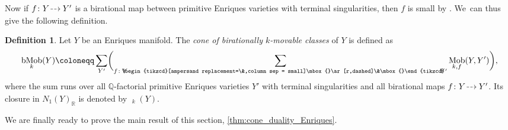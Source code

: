 \documentclass[JEP,XML,SOM,Unicode,published]{cedram}
\newcommand{\dradpl}{{\hspace*{-2.5mm}\begin{tikzcd}[ampersand replacement=\&,column sep = scriptsize]\mbox{}\ar[r,dashed]\&\mbox{}\end{tikzcd}\hspace*{-2.5mm}}}
\newcommand{\dratst}{{\hspace*{-2.5mm}\begin{tikzcd}[ampersand replacement=\&,column sep = small]\mbox{}\ar[r,dashed]\&\mbox{}\end{tikzcd}\hspace*{-2mm}}}
\let\drascst\dratst
\newcommand{\dra}{\mathchoice{\dradpl}{\dratst}{\drascst}{\drascst}}
\theoremstyle{plain}
\theoremstyle{definition}
\newtheorem{dfn}[thm]{Definition}
\newcommand{\Q}{\mathbb{Q}}
\newcommand{\R}{\mathbb{R}}
\DeclareMathOperator{\Mob}{Mob}
\DeclareMathOperator{\bMob}{bMob}
\DeclareMathOperator{\bMobc}{\overline{\mathrm{bMob}}}
\begin{document}
Now if $f \colon Y \dra Y'$ is a birational map between primitive Enriques varieties with terminal singularities, then $f$ is small by \cite[Cor.\,3.54]{KM98}. We~can thus give the following definition.

\begin{dfn}
\label{dfn:birationally_k-movable_cone}
Let $Y$ be an Enriques manifold. The \emph{cone of birationally $k$\nobreakdash-movable classes} of $Y$ is defined as
\[
\bMob_k(Y) \coloneqq
\sum_{Y'} \biggl(\sum_{f \colon Y \dra Y'} \Mob_{k,f}(Y,Y')\biggr),
\]
where the sum runs over all $\Q$\nobreakdash-factorial primitive Enriques varieties $Y'$ with terminal singularities and all birational maps $f \colon Y \dra Y'$. Its closure in $N_1(Y)_\R$ is denoted by $\bMobc_k(Y)$.
\end{dfn}

We are finally ready to prove the main result of this section, \autoref{thm:cone_duality_Enriques}.
\end{document}
